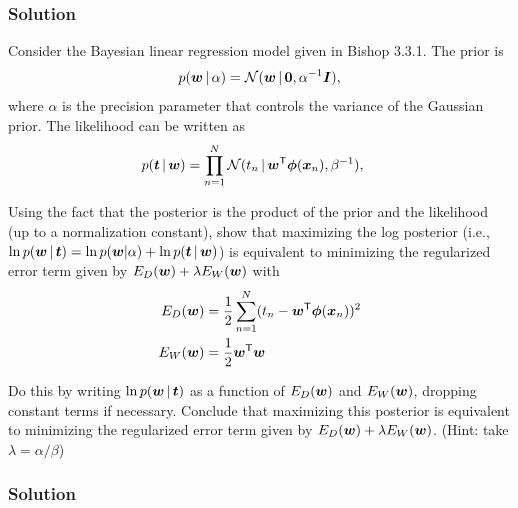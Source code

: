 \documentclass[submit]{harvardml}
\begin{document}
\subsubsection*{Solution}











\newpage
\begin{problem}
Consider the Bayesian linear regression model given in Bishop 3.3.1. The prior is
\begin{align*}
p(\boldsymbol{w} \,|\, \alpha) = \mathcal{N}(\boldsymbol{w} \,|\, \bold0, \alpha^{-1}\boldsymbol{I} ),
\end{align*}
where $\alpha$ is the precision parameter that controls the variance of the Gaussian prior.  The likelihood can be written as
\begin{align*}
p(\boldsymbol{t} \,|\, \boldsymbol{w}) &= \prod_{n=1}^N \mathcal{N}(t_n \,|\, \boldsymbol{w}^{\mathsf{T}} \boldsymbol{\phi}(\boldsymbol{x}_n), \beta^{-1}),
\end{align*}

Using the fact that the posterior is the product of the prior and the likelihood (up to a normalization constant), show that maximizing the log posterior (i.e., $\ln p(\boldsymbol{w} \,|\, \boldsymbol{t})= \ln p(\boldsymbol{w} | \alpha) + \ln p(\boldsymbol{t} \,|\, \boldsymbol{w})$) is equivalent to minimizing the regularized error term given by ${E_D(\boldsymbol{w}) + \lambda E_W(\boldsymbol{w})}$ with 
\begin{align*}
E_D(\boldsymbol{w}) &= \frac{1}{2}\sum_{n = 1}^N (t_n - \boldsymbol{w}^{\mathsf{T}} \boldsymbol{\phi}(\boldsymbol{x}_n))^2 \\
E_W(\boldsymbol{w}) &= \frac{1}{2}\boldsymbol{w}^{\mathsf{T}} \boldsymbol{w}
\end{align*} 

Do this by writing $\ln p(\boldsymbol{w} \,|\, \boldsymbol{t})$ as a function of $E_D(\boldsymbol{w})$ and $E_W(\boldsymbol{w})$, dropping constant terms if necessary.  Conclude that maximizing this posterior is equivalent to minimizing the regularized error term given by $E_D(\boldsymbol{w}) + \lambda E_W(\boldsymbol{w})$. (Hint: take $\lambda = \alpha/\beta$)
\end{problem}


\subsubsection*{Solution}
\end{document}
